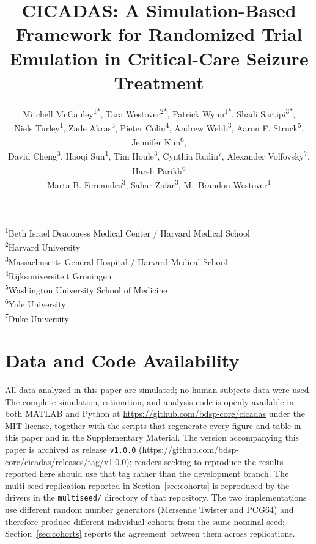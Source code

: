 \documentclass{article}
\title{CICADAS: A Simulation-Based Framework for Randomized Trial Emulation in Critical-Care Seizure Treatment}
\author{
    Mitchell McCauley\textsuperscript{1*},
    Tara Westover\textsuperscript{2*}, 
    Patrick Wynn\textsuperscript{1*}, 
    Shadi Sartipi\textsuperscript{3*}, \\
    Niels Turley\textsuperscript{1},
    Zade Akras\textsuperscript{3},
    Pieter Colin\textsuperscript{4},
    Andrew Webb\textsuperscript{3}, 
    Aaron F. Struck\textsuperscript{5},
    Jennifer Kim\textsuperscript{6},\\ 
    David Cheng\textsuperscript{3}, %
    Haoqi Sun\textsuperscript{1}, 
    Tim Houle\textsuperscript{3}, 
    Cynthia Rudin\textsuperscript{7}, 
    Alexander Volfovsky\textsuperscript{7}, Harsh Parikh\textsuperscript{6} \\
    Marta B. Fernandes\textsuperscript{3\dag}, %
    Sahar Zafar\textsuperscript{3\dag},
    M.\ Brandon Westover\textsuperscript{1\dag}
}
\date{} %
\begin{document}
\maketitle

\begingroup
\renewcommand\thefootnote{\fnsymbol{footnote}}
\endgroup

\begingroup
\small
\noindent\textsuperscript{1}Beth Israel Deaconess Medical Center / Harvard Medical School\\
\textsuperscript{2}Harvard University\\
\textsuperscript{3}Massachusetts General Hospital / Harvard Medical School\\
\textsuperscript{4}Rijksuniversiteit Groningen\\
\textsuperscript{5}Washington University School of Medicine\\
\textsuperscript{6}Yale University\\
\textsuperscript{7}Duke University

\par
\endgroup












\section*{Data and Code Availability}
All data analyzed in this paper are simulated; no human-subjects data were used. The complete
simulation, estimation, and analysis code is openly available in both MATLAB and Python at
\url{https://github.com/bdsp-core/cicadas} under the MIT license, together with the scripts that
regenerate every figure and table in this paper and in the Supplementary Material. The version
accompanying this paper is archived as release \texttt{v1.0.0}
(\url{https://github.com/bdsp-core/cicadas/releases/tag/v1.0.0}); readers seeking to reproduce the
results reported here should use that tag rather than the development branch. The multi-seed
replication reported in Section~\ref{sec:cohorts} is reproduced by the drivers in the
\texttt{multiseed/} directory of that repository. The two implementations use different random number
generators (Mersenne Twister and PCG64) and therefore produce different individual cohorts from the
same nominal seed; Section~\ref{sec:cohorts} reports the agreement between them across replications.



\end{document}
